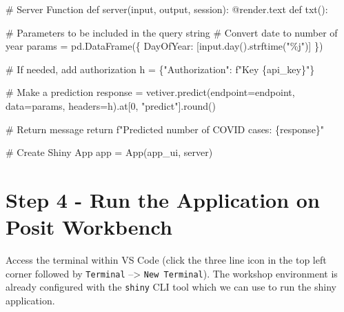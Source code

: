 \documentclass[
  letterpaper,
  DIV=11,
  numbers=noendperiod]{scrreprt}
\newenvironment{Shaded}{\begin{snugshade}}{\end{snugshade}}
\newcommand{\AttributeTok}[1]{\textcolor[rgb]{0.40,0.45,0.13}{#1}}
\newcommand{\BuiltInTok}[1]{\textcolor[rgb]{0.00,0.23,0.31}{#1}}
\newcommand{\CommentTok}[1]{\textcolor[rgb]{0.37,0.37,0.37}{#1}}
\newcommand{\ControlFlowTok}[1]{\textcolor[rgb]{0.00,0.23,0.31}{#1}}
\newcommand{\DecValTok}[1]{\textcolor[rgb]{0.68,0.00,0.00}{#1}}
\newcommand{\KeywordTok}[1]{\textcolor[rgb]{0.00,0.23,0.31}{#1}}
\newcommand{\NormalTok}[1]{\textcolor[rgb]{0.00,0.23,0.31}{#1}}
\newcommand{\OperatorTok}[1]{\textcolor[rgb]{0.37,0.37,0.37}{#1}}
\newcommand{\SpecialCharTok}[1]{\textcolor[rgb]{0.37,0.37,0.37}{#1}}
\newcommand{\SpecialStringTok}[1]{\textcolor[rgb]{0.13,0.47,0.30}{#1}}
\newcommand{\StringTok}[1]{\textcolor[rgb]{0.13,0.47,0.30}{#1}}
\begin{document}
\begin{Shaded}
\begin{Highlighting}[]
\CommentTok{\# Server Function}
\KeywordTok{def}\NormalTok{ server(}\BuiltInTok{input}\NormalTok{, output, session):}
    \AttributeTok{@render.text}
    \KeywordTok{def}\NormalTok{ txt():}
       
        \CommentTok{\# Parameters to be included in the query string}
        \CommentTok{\#  Convert date to number of year}
\NormalTok{        params }\OperatorTok{=}\NormalTok{ pd.DataFrame(\{}
            \StringTok{\textquotesingle{}DayOfYear\textquotesingle{}}\NormalTok{: [}\BuiltInTok{input}\NormalTok{.day().strftime(}\StringTok{"\%j"}\NormalTok{)]}
\NormalTok{        \})}

        \CommentTok{\# If needed, add authorization}
\NormalTok{        h }\OperatorTok{=}\NormalTok{ \{}\StringTok{"Authorization"}\NormalTok{: }\SpecialStringTok{f"Key }\SpecialCharTok{\{}\NormalTok{api\_key}\SpecialCharTok{\}}\SpecialStringTok{"}\NormalTok{\}}

        \CommentTok{\# Make a prediction}
\NormalTok{        response }\OperatorTok{=}\NormalTok{ vetiver.predict(endpoint}\OperatorTok{=}\NormalTok{endpoint, data}\OperatorTok{=}\NormalTok{params, headers}\OperatorTok{=}\NormalTok{h).at[}\DecValTok{0}\NormalTok{, }\StringTok{"predict"}\NormalTok{].}\BuiltInTok{round}\NormalTok{()}

        \CommentTok{\# Return message}
        \ControlFlowTok{return} \SpecialStringTok{f"Predicted number of COVID cases: }\SpecialCharTok{\{}\NormalTok{response}\SpecialCharTok{\}}\SpecialStringTok{"}
      
\CommentTok{\# Create Shiny App}
\NormalTok{app }\OperatorTok{=}\NormalTok{ App(app\_ui, server)}
\end{Highlighting}
\end{Shaded}

\section{Step 4 - Run the Application on Posit
Workbench}\label{step-4---run-the-application-on-posit-workbench}

Access the terminal within VS Code (click the three line icon in the top
left corner followed by \texttt{Terminal} --\textgreater{}
\texttt{New\ Terminal}). The workshop environment is already configured
with the \texttt{shiny} CLI tool which we can use to run the shiny
application.
\end{document}
